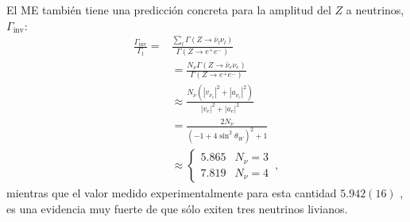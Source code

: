El ME también tiene una predicción concreta para la amplitud del $Z$ a neutrinos, $\Gamma_{\text{inv}}$:
\begin{align}
  \frac{\Gamma_{\text{inv}}}{\Gamma_l}=&\frac{\sum_l\Gamma(Z\to\bar{\nu}_l\nu_l)}{\Gamma(Z\to e^+ e^-)}\nonumber\\
  &=\frac{N_\nu\Gamma(Z\to\bar{\nu}_e\nu_e)}{\Gamma(Z\to e^+ e^-)}\nonumber\\
  &\approx\frac{N_\nu(|v_{\nu_e}|^2+|a_{\nu_e}|^2)}{|v_{e}|^2+|a_{e}|^2}\nonumber\\
  &=\frac{2N_\nu}{(-1+4\sin^2\theta_W)^2+1}\nonumber\\
  &\approx\begin{cases}
    5.865&N_\nu=3\\
    7.819&N_\nu=4
  \end{cases}\,,
\end{align}
mientras que el valor medido experimentalmente para esta cantidad $5.942(16)$ \cite{a}, es una evidencia muy fuerte de que sólo exiten tres neutrinos livianos. 

